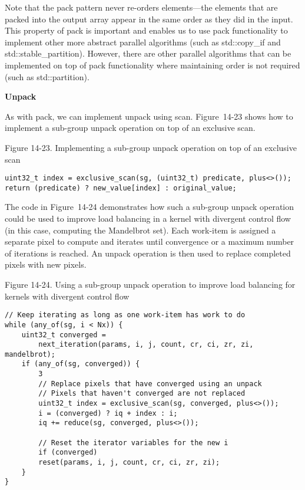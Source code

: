 Note that the pack pattern never re-orders elements—the elements that are packed into the output array appear in the same order as they did in the input. This property of pack is important and enables us to use pack functionality to implement other more abstract parallel algorithms (such as std::copy\_if and std::stable\_partition). However, there are other parallel algorithms that can be implemented on top of pack functionality where maintaining order is not required (such as std::partition).\par

\hspace*{\fill} \par %
\textbf{Unpack}

As with pack, we can implement unpack using scan. Figure 14-23 shows how to implement a sub-group unpack operation on top of an exclusive scan.\par

\hspace*{\fill} \par %
Figure 14-23. Implementing a sub-group unpack operation on top of an exclusive scan
\begin{lstlisting}[caption={}]
uint32_t index = exclusive_scan(sg, (uint32_t) predicate, plus<>());
return (predicate) ? new_value[index] : original_value;
\end{lstlisting}

The code in Figure 14-24 demonstrates how such a sub-group unpack operation could be used to improve load balancing in a kernel with divergent control flow (in this case, computing the Mandelbrot set). Each work-item is assigned a separate pixel to compute and iterates until convergence or a maximum number of iterations is reached. An unpack operation is then used to replace completed pixels with new pixels.\par

\hspace*{\fill} \par %
Figure 14-24. Using a sub-group unpack operation to improve load balancing for kernels with divergent control flow
\begin{lstlisting}[caption={}]
// Keep iterating as long as one work-item has work to do
while (any_of(sg, i < Nx)) {
	uint32_t converged =
		next_iteration(params, i, j, count, cr, ci, zr, zi, mandelbrot);
	if (any_of(sg, converged)) {
		3
		// Replace pixels that have converged using an unpack
		// Pixels that haven't converged are not replaced
		uint32_t index = exclusive_scan(sg, converged, plus<>());
		i = (converged) ? iq + index : i;
		iq += reduce(sg, converged, plus<>());
		
		// Reset the iterator variables for the new i
		if (converged)
		reset(params, i, j, count, cr, ci, zr, zi);
	}
}
\end{lstlisting}

